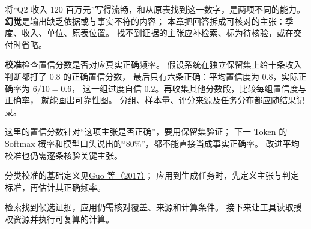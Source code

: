将“Q2 收入 120 百万元”写得流畅，和从原表找到这一数字，是两项不同的能力。
\textbf{幻觉}是输出缺乏依据或与事实不符的内容；
本章把回答拆成可核对的主张：季度、收入、单位、原表位置。
找不到证据的主张应补检索、标为待核验，或在交付时省略。

\textbf{校准}检查置信分数是否对应真实正确频率。
假设系统在独立保留集上给十条收入判断都打了 $0.8$ 的正确置信分数，
最后只有六条正确：平均置信度为 $0.8$，实际正确率为 $6/10=0.6$，
这一组过度自信 $0.2$。再收集其他分数段，比较每组置信度与正确率，
就能画出可靠性图。
分组、样本量、评分来源及任务分布都应随结果记录。

\begin{boundarybox}
这里的置信分数针对“这项主张是否正确”，要用保留集验证；
下一 Token 的 Softmax 概率和模型口头说出的“80\%”，都不能直接当成事实正确率。
改进平均校准也仍需逐条核验关键主张。
\end{boundarybox}
分类校准的基础定义见\href{https://proceedings.mlr.press/v70/guo17a.html}{Guo 等（2017）}；
应用到生成任务时，先定义主张与判定标准，再估计其正确频率。

\par\smallskip
检索找到候选证据，应用仍需核对覆盖、来源和计算条件。
接下来让工具读取授权资源并执行可复算的计算。
